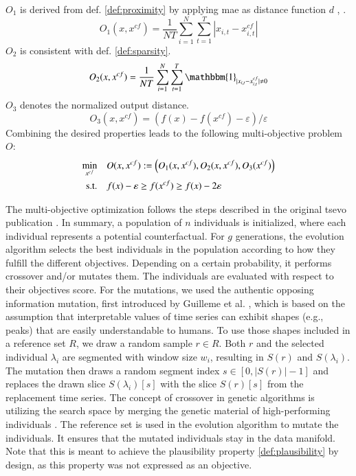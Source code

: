 \begin{definition}
$O_{1}$ is derived from def. \ref{def:proximity} by applying \gls{mae} as distance function $d$ \cite{mothilal_explaining_2020}, \cite{wachter_counterfactual_2018}.
$$O_{1}(x, x^{c f})=\frac{1}{NT} \sum_{i=1}^{N} \sum_{t=1}^{T}|x_{i, t}-x_{i, t}^{c f}|$$ $O_{2}$ is consistent with def. \ref{def:sparsity}.
$$O_{2}(x, x^{c f})=\frac{1}{NT} \sum_{i=1}^{N} \sum_{t=1}^{T} \mathbbm{1}_{|x_{i, t}-x_{i, t}^{c f}| \neq 0}$$ $O_{3}$ denotes the normalized output distance.
$$O_{3}(x, x^{c f})=(f(x) - f(x^{c f})-\varepsilon) / \varepsilon$$ Combining the desired properties leads to the following multi-objective problem $O$:
\begin{equation}
\begin{aligned}
\min_{x^{cf}} \quad & O(x, x^{cf}):=\left(O_{1}(x, x^{c f}), O_{2}(x, x^{c f}), O_{3}(x^{c f})\right)\\
\mathrm{s.t.} \quad & f(x) - \varepsilon \geq f(x^{c f}) \geq f(x) - 2\varepsilon\\
\end{aligned}
\end{equation}
\end{definition}
The multi-objective optimization follows the steps described in the original \gls{tsevo} publication \cite{hollig_tsevo_2022}.
In summary, a population of $n$ individuals is initialized, where each individual represents a potential counterfactual. For $g$ generations, the evolution algorithm selects the best individuals in the population according to how they fulfill the different objectives. Depending on a certain probability, it performs crossover and/or mutates them. The individuals are evaluated with respect to their objectives score. For the mutations, we used the authentic opposing information mutation, first introduced by Guilleme et al. \cite{guilleme_agnostic_2019}, which is based on the assumption that interpretable values of time series can exhibit shapes (e.g., peaks) that are easily understandable to humans.
To use those shapes included in a reference set $R$, we draw a random sample $r \in R$. 
Both $r$ and the selected individual $\lambda_i$ are segmented with window size $w_i$, resulting in $S(r)$ and $S(\lambda_i)$. The mutation then draws a random segment index $s \in [ 0,|S(r)|-1]$ and replaces the drawn slice $S(\lambda_i)[s]$ with the slice $S(r)[s]$ from the replacement time series. The concept of crossover in genetic algorithms is utilizing the search space by merging the genetic material of high-performing individuals \cite{mitchell_introduction_1998}.
The reference set is used in the evolution algorithm to mutate the individuals. It ensures that the mutated individuals stay in the data manifold. Note that this is meant to achieve the plausibility property \ref{def:plausibility} by design, as this property was not expressed as an objective.


